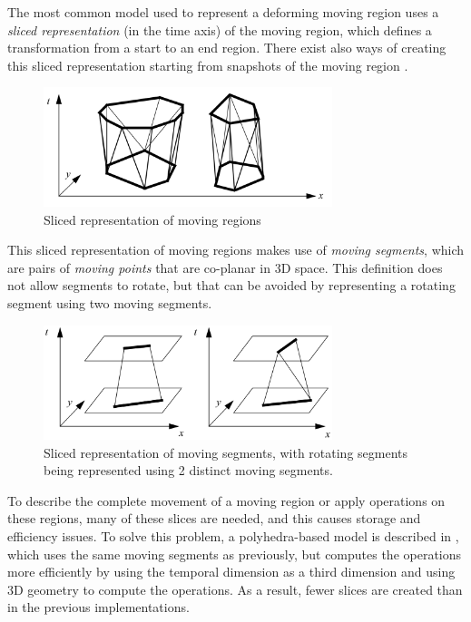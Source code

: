The most common model used to represent a deforming moving region uses a \textit{sliced representation} \cite{algos_for_mod,model_structure_for_mod} (in the time axis) of the moving region, which defines a transformation from a start to an end region. There exist also ways of creating this sliced representation starting from snapshots of the moving region \cite{repr_from_obs}.

\begin{figure}[h!]
    \centering
    \includegraphics[width=0.75\textwidth]{images/sliced_moving_region.png}
    \caption[Sliced representation of moving regions]{Sliced representation of moving regions \cite{polyhedra}}
    \label{fig:sliced_repr_polygons}
\end{figure}

This sliced representation of moving regions makes use of \textit{moving segments}, which are pairs of \textit{moving points} that are co-planar in 3D space. This definition does not allow segments to rotate, but that can be avoided by representing a rotating segment using two moving segments.

\begin{figure}[h!]
    \centering
    \includegraphics[width=0.75\textwidth]{images/sliced_moving_segments.png}
    \caption[Sliced representation of moving segments]{Sliced representation of moving segments, with rotating segments being represented using 2 distinct moving segments. \cite{polyhedra}}
    \label{fig:sliced_repr_segments}
\end{figure}


To describe the complete movement of a moving region or apply operations on these regions, many of these slices are needed, and this causes storage and efficiency issues. To solve this problem, a polyhedra-based model is described in \cite{polyhedra}, which uses the same moving segments as previously, but computes the operations more efficiently by using the temporal dimension as a third dimension and using 3D geometry to compute the operations. As a result, fewer slices are created than in the previous implementations.

